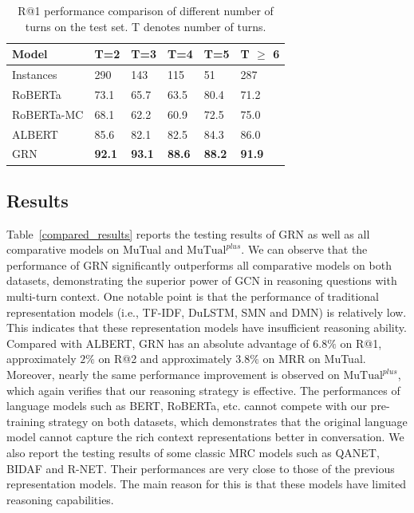 \documentclass[letterpaper]{article} %
\begin{document}
\begin{table}[t]
\centering
\begin{tabular}{l|l|l|l|l|l}
     \hline
      Model & T=2 & T=3 & T=4 & T=5 & T $\geq$ 6  \\ \hline
     Instances & 290 & 143 & 115 & 51 & 287  \\
     RoBERTa & 73.1 & 65.7 & 63.5 & 80.4 & 71.2  \\
     RoBERTa-MC & 68.1 & 62.2 & 60.9 & 72.5 & 75.0  \\
     ALBERT & 85.6 & 82.1 & 82.5 & 84.3 & 86.0  \\
     GRN & \textbf{92.1} & \textbf{93.1} & \textbf{88.6} & \textbf{88.2} & \textbf{91.9} \\  \hline
\end{tabular}
\caption{R@1 performance comparison of different number of turns on the test set. T denotes number of
turns.}
\label{acc_results}
\end{table}
\subsection{Results}
Table~\ref{compared_results} reports the testing results of GRN as well as all comparative models on MuTual and $\text{MuTual}^{plus}$. We can observe that the performance of GRN significantly outperforms all comparative models on both datasets, demonstrating the superior power of GCN in reasoning questions with multi-turn context. One notable point is that the performance of traditional representation models (i.e., TF-IDF, DuLSTM, SMN and DMN) is relatively low. This indicates that these representation models have insufficient reasoning ability. Compared with ALBERT, GRN has an absolute advantage of $6.8\%$ on R@1, approximately $2\%$ on R@2 and approximately $3.8\%$ on MRR on MuTual. Moreover, nearly the same performance improvement is observed on $\text{MuTual}^{plus}$, which again verifies that our reasoning strategy is effective. The performances of language models such as BERT, RoBERTa, etc. cannot compete with our pre-training strategy on both datasets, which demonstrates that the original language model cannot capture the rich context representations better in conversation.
We also report the testing results of some classic MRC models such as QANET, BIDAF and R-NET. Their performances are very close to those of the previous representation models. The main reason for this is that these models have limited reasoning capabilities.
\end{document}
